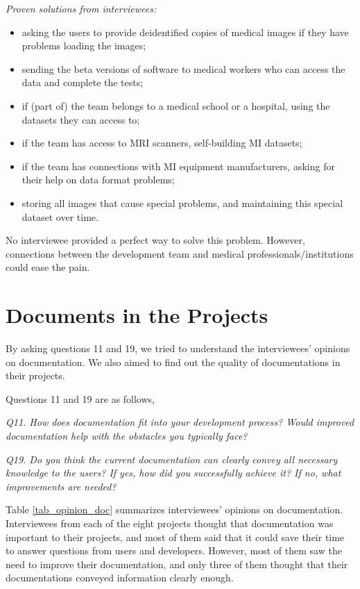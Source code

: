 \textit{Proven solutions from interviewees:}
\begin{itemize}
\item asking the users to provide deidentified copies of medical images if they have problems loading the images;
\item sending the beta versions of software to medical workers who can access the data and complete the tests;
\item if (part of) the team belongs to a medical school or a hospital, using the datasets they can access to;
\item if the team has access to MRI scanners, self-building MI datasets;
\item if the team has connections with MI equipment manufacturers, asking for their help on data format problems;
\item storing all images that cause special problems, and maintaining this special dataset over time.
\end{itemize}

No interviewee provided a perfect way to solve this problem. However, connections between the development team and medical professionals/institutions could ease the pain.

\section{Documents in the Projects}
\label{sec_interview_documents}
By asking questions 11 and 19, we tried to understand the interviewees' opinions on documentation. We also aimed to find out the quality of documentations in their projects.

Questions 11 and 19 are as follows,

\textit{Q11. How does documentation fit into your development process? Would improved documentation help with the obstacles you typically face?}

\textit{Q19. Do you think the current documentation can clearly convey all necessary knowledge to the users? If yes, how did you successfully achieve it? If no, what improvements are needed?}

Table \ref{tab_opinion_doc} summarizes interviewees' opinions on documentation. Interviewees from each of the eight projects thought that documentation was important to their projects, and most of them said that it could save their time to answer questions from users and developers. However, most of them saw the need to improve their documentation, and only three of them thought that their documentations conveyed information clearly enough. 

